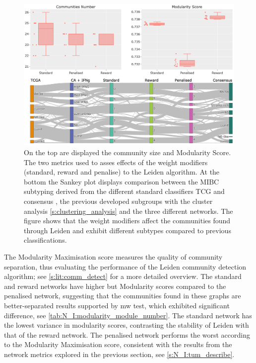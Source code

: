 \begin{figure}[!t]    
    \centering
    \includegraphics[width=1.0\textwidth,keepaspectratio]{Sections/Network_I/Resources/Tum_network/LeidenMetrics_Sankey_TF-6.png}
    \caption[Tum: Leiden metrics]{On the top are displayed the community size and Modularity Score. The two metrics used to asses effects of the weight modifiers (standard, reward and penalise) to the Leiden algorithm. At the bottom the Sankey plot displays comparison between the MIBC subtyping derived from the different standard classifiers TCG and consensus \citep{Robertson2017-mg,Kamoun2020-tj}, the previous developed subgroups with the cluster analysis \cref{s:clustering_analysis} and the three different networks. The figure shows that the weight modifiers affect the communities found through Leiden and exhibit different subtypes compared to previous classifications.}
    \label{fig:N_I:tum_leiden_modifiers}
\end{figure}


The Modularity Maximisation score measures the quality of community separation, thus evaluating the performance of the Leiden community detection algorithm; see \cref{s:lit:comm_detect} for a more detailed overview. The standard and reward networks have higher but Modularity scores compared to the penalised network, suggesting that the communities found in these graphs are better-separated results supported by \acrlong{mw} test, which exhibited significant difference, see \cref{tab:N_I:modularity_module_number}. The standard network has the lowest variance in modularity scores, contrasting the stability of Leiden with that of the reward network. The penalised network performs the worst according to the Modularity Maximisation score, consistent with the results from the network metrics explored in the previous section, see \cref{s:N_I:tum_describe}.

